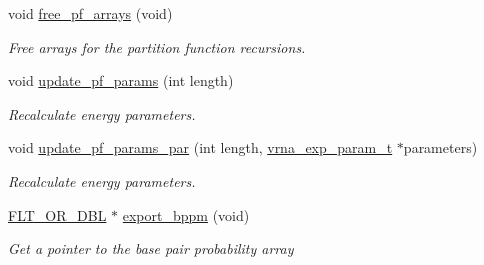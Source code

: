 \begin{DoxyCompactItemize}
void \mbox{\hyperlink{group__pf__fold_gae73db3f49a94f0f72e067ecd12681dbd}{free\+\_\+pf\+\_\+arrays}} (void)
\begin{DoxyCompactList}\small\item\em Free arrays for the partition function recursions. \end{DoxyCompactList}\item 
void \mbox{\hyperlink{group__pf__fold_ga384e927890f9c034ff09fa66da102d28}{update\+\_\+pf\+\_\+params}} (int length)
\begin{DoxyCompactList}\small\item\em Recalculate energy parameters. \end{DoxyCompactList}\item 
void \mbox{\hyperlink{group__pf__fold_gaafe2d1b21f5418b123b088aa395e827d}{update\+\_\+pf\+\_\+params\+\_\+par}} (int length, \mbox{\hyperlink{group__energy__parameters_ga01d8b92fe734df8d79a6169482c7d8d8}{vrna\+\_\+exp\+\_\+param\+\_\+t}} $\ast$parameters)
\begin{DoxyCompactList}\small\item\em Recalculate energy parameters. \end{DoxyCompactList}\item 
\mbox{\hyperlink{group__data__structures_ga31125aeace516926bf7f251f759b6126}{F\+L\+T\+\_\+\+O\+R\+\_\+\+D\+BL}} $\ast$ \mbox{\hyperlink{group__pf__fold_gac5ac7ee281aae1c5cc5898a841178073}{export\+\_\+bppm}} (void)
\begin{DoxyCompactList}\small\item\em Get a pointer to the base pair probability array


\end{DoxyCompactList}
\end{DoxyCompactItemize}
